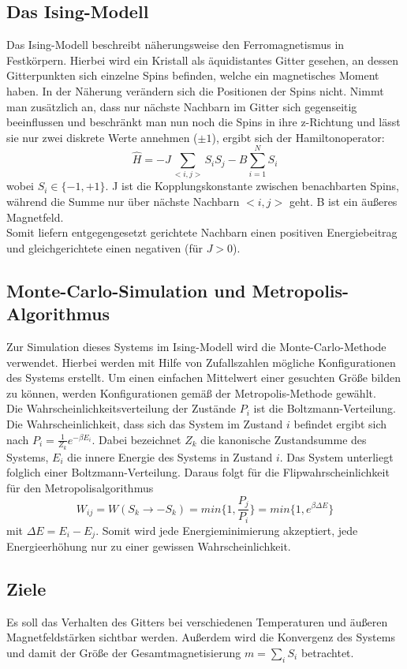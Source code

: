 \subsection{Das Ising-Modell}

Das Ising-Modell beschreibt näherungsweise den Ferromagnetismus in Festkörpern. Hierbei wird ein Kristall als äquidistantes Gitter gesehen, an dessen Gitterpunkten sich einzelne Spins befinden, welche ein magnetisches Moment haben. In der Näherung verändern sich die Positionen der Spins nicht. Nimmt man zusätzlich an, dass nur nächste Nachbarn im Gitter sich gegenseitig beeinflussen und beschränkt man nun noch die Spins in ihre z-Richtung und lässt sie nur zwei diskrete Werte annehmen ($\pm1$), ergibt sich der Hamiltonoperator:\\
\[
\hat{H}=-J\sum_{<i,j>} S_i S_j - B\sum_{i=1}^N S_i
\]
wobei $S_i \in \{-1,+1\}$. J ist die Kopplungskonstante zwischen benachbarten Spins, während die Summe nur über nächste Nachbarn $<i,j>$ geht. B ist ein äußeres Magnetfeld.\\
Somit liefern entgegengesetzt gerichtete Nachbarn einen positiven Energiebeitrag und gleichgerichtete einen negativen (für $J>0$).\\

\subsection{Monte-Carlo-Simulation und Metropolis-Algorithmus}
\label{theo2}
Zur Simulation dieses Systems im Ising-Modell wird die Monte-Carlo-Methode verwendet. Hierbei werden mit Hilfe von Zufallszahlen mögliche Konfigurationen des Systems erstellt. Um einen einfachen Mittelwert einer gesuchten Größe bilden zu können, werden Konfigurationen gemäß der Metropolis-Methode gewählt.\\
Die Wahrscheinlichkeitsverteilung der Zustände $P_i$ ist die Boltzmann-Verteilung. Die Wahrscheinlichkeit, dass sich das System im Zustand $i$ befindet ergibt sich nach $P_{i}=\frac{1}{Z_{k}} e^{-\beta E_{i}}$. Dabei bezeichnet $Z_{k}$ die kanonische Zustandsumme des Systems, $E_{i}$ die innere Energie des Systems in Zustand $i$. Das System unterliegt folglich einer Boltzmann-Verteilung. Daraus folgt für die Flipwahrscheinlichkeit für den Metropolisalgorithmus
\begin{equation}
W_{ij}=W(S_k \rightarrow -S_k)=min\{1,\frac{P_{j}}{P_{i}}\}=min\{1,e^{\beta \Delta E}\}
\end{equation}
mit $\Delta E=E_{i}-E_{j}$. Somit wird jede Energieminimierung akzeptiert, jede Energieerhöhung nur zu einer gewissen Wahrscheinlichkeit.


\subsection{Ziele}

Es soll das Verhalten des Gitters bei verschiedenen Temperaturen und äußeren Magnetfeldstärken sichtbar werden. Außerdem wird die Konvergenz des Systems und damit der Größe der Gesamtmagnetisierung $m=\sum_i S_i$ betrachtet.
